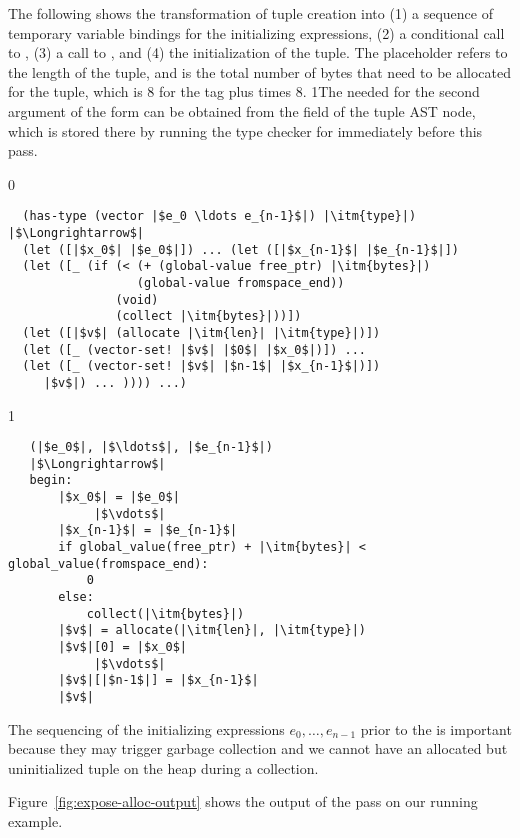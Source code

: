 \documentclass[7x10]{TimesAPriori_MIT}%
\def\racketEd{0}
\def\pythonEd{1}
\def\edition{1}
\newcommand{\pythonColor}[0]{}
\newcommand{\python}[1]{{\if\edition\pythonEd\pythonColor #1\fi}}
\numberwithin{theorem}{chapter}
\numberwithin{definition}{chapter}
\numberwithin{equation}{chapter}
\begin{document}
The following shows the transformation of tuple creation into (1) a
sequence of temporary variable bindings for the initializing
expressions, (2) a conditional call to , (3) a call to
, and (4) the initialization of the tuple. The
 placeholder refers to the length of the tuple, and
 is the total number of bytes that need to be allocated for
the tuple, which is 8 for the tag plus  times 8.
%
\python{The  needed for the second argument of the
  \code{allocate} form can be obtained from the \code{has\_type} field
  of the tuple AST node, which is stored there by running the type
  checker for \LangVec{} immediately before this pass.}
%
\begin{center}
\begin{minipage}{\textwidth}
{\if\edition\racketEd
\begin{lstlisting}
  (has-type (vector |$e_0 \ldots e_{n-1}$|) |\itm{type}|)
|$\Longrightarrow$|
  (let ([|$x_0$| |$e_0$|]) ... (let ([|$x_{n-1}$| |$e_{n-1}$|])
  (let ([_ (if (< (+ (global-value free_ptr) |\itm{bytes}|)
                  (global-value fromspace_end))
               (void)
               (collect |\itm{bytes}|))])
  (let ([|$v$| (allocate |\itm{len}| |\itm{type}|)])
  (let ([_ (vector-set! |$v$| |$0$| |$x_0$|)]) ...
  (let ([_ (vector-set! |$v$| |$n-1$| |$x_{n-1}$|)])
     |$v$|) ... )))) ...)
\end{lstlisting}
\fi}
{\if\edition\pythonEd\pythonColor
\begin{lstlisting}
   (|$e_0$|, |$\ldots$|, |$e_{n-1}$|)
   |$\Longrightarrow$|
   begin:
       |$x_0$| = |$e_0$|
            |$\vdots$|
       |$x_{n-1}$| = |$e_{n-1}$|
       if global_value(free_ptr) + |\itm{bytes}| < global_value(fromspace_end):
           0
       else:
           collect(|\itm{bytes}|)
       |$v$| = allocate(|\itm{len}|, |\itm{type}|)
       |$v$|[0] = |$x_0$|
            |$\vdots$|
       |$v$|[|$n-1$|] = |$x_{n-1}$|
       |$v$|
\end{lstlisting}
\fi}
\end{minipage}
\end{center}
%
\noindent The sequencing of the initializing expressions
$e_0,\ldots,e_{n-1}$ prior to the  is important because
they may trigger garbage collection and we cannot have an allocated
but uninitialized tuple on the heap during a collection.

Figure~\ref{fig:expose-alloc-output} shows the output of the
 pass on our running example.
\end{document}
